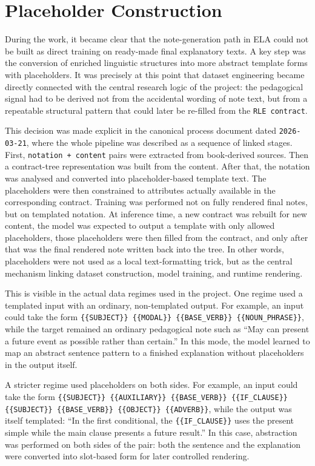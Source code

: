 \documentclass[12pt,a4paper,oneside]{report}
\begin{document}
\section{Placeholder Construction}
During the work, it became clear that the note-generation path in ELA could not be built as direct training on ready-made final explanatory texts. A key step was the conversion of enriched linguistic structures into more abstract template forms with placeholders. It was precisely at this point that dataset engineering became directly connected with the central research logic of the project: the pedagogical signal had to be derived not from the accidental wording of note text, but from a repeatable structural pattern that could later be re-filled from the \texttt{RLE contract}.

This decision was made explicit in the canonical process document dated \texttt{2026-03-21}, where the whole pipeline was described as a sequence of linked stages. First, \texttt{notation + content} pairs were extracted from book-derived sources. Then a contract-tree representation was built from the content. After that, the notation was analysed and converted into placeholder-based template text. The placeholders were then constrained to attributes actually available in the corresponding contract. Training was performed not on fully rendered final notes, but on templated notation. At inference time, a new contract was rebuilt for new content, the model was expected to output a template with only allowed placeholders, those placeholders were then filled from the contract, and only after that was the final rendered note written back into the tree. In other words, placeholders were not used as a local text-formatting trick, but as the central mechanism linking dataset construction, model training, and runtime rendering.

This is visible in the actual data regimes used in the project. One regime used a templated input with an ordinary, non-templated output. For example, an input could take the form \texttt{\{\{SUBJECT\}\} \{\{MODAL\}\} \{\{BASE\_VERB\}\} \{\{NOUN\_PHRASE\}\}}, while the target remained an ordinary pedagogical note such as ``May can present a future event as possible rather than certain.'' In this mode, the model learned to map an abstract sentence pattern to a finished explanation without placeholders in the output itself.

A stricter regime used placeholders on both sides. For example, an input could take the form \texttt{\{\{SUBJECT\}\} \{\{AUXILIARY\}\} \{\{BASE\_VERB\}\} \{\{IF\_CLAUSE\}\} \{\{SUBJECT\}\} \{\{BASE\_VERB\}\} \{\{OBJECT\}\} \{\{ADVERB\}\}}, while the output was itself templated: ``In the first conditional, the \texttt{\{\{IF\_CLAUSE\}\}} uses the present simple while the main clause presents a future result.'' In this case, abstraction was performed on both sides of the pair: both the sentence and the explanation were converted into slot-based form for later controlled rendering.
\end{document}
